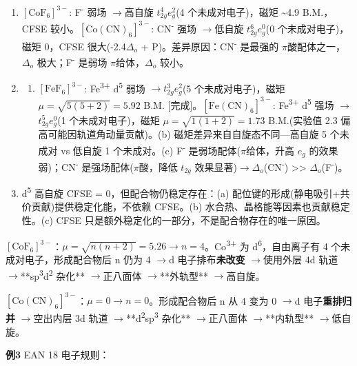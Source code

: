 \documentclass[a4paper,11pt]{ctexart}
\providecommand{\tightlist}{\setlength{\itemsep}{0pt}\setlength{\parskip}{0pt}}
\newcommand{\箭}{\ensuremath{\rightarrow}}
\newcommand{\左箭}{\ensuremath{\leftarrow}}
\newcommand{\上箭}{\ensuremath{\uparrow}}
\newcommand{\下箭}{\ensuremath{\downarrow}}
\newcommand{\衡}{\ensuremath{\rightleftharpoons}}
\newcommand{\双箭}{\ensuremath{\leftrightarrow}}
\newcommand{\约等于}{\ensuremath{\approx}}
\newcommand{\小于等于}{\ensuremath{\leq}}
\newcommand{\大于等于}{\ensuremath{\geq}}
\newcommand{\不等于}{\ensuremath{\neq}}
\newcommand{\西格马}{\ensuremath{\sigma}}
\newcommand{\派}{\ensuremath{\pi}}
\begin{document}
\begin{enumerate}
\begin{enumerate}
  \end{enumerate}
\item
  \([\mathrm{CoF_6}]^{3-}\): F\textsuperscript{-} 弱场 \箭 高自旋 \(t_{2g}^4 e_g^2\)(4 个未成对电子)，磁矩 \textasciitilde4.9 B.M.，CFSE 较小。\([\mathrm{Co(CN)_6}]^{3-}\): CN\textsuperscript{-} 强场 \箭 低自旋 \(t_{2g}^6 e_g^0\)(0 个未成对电子)，磁矩 0，CFSE 很大(-2.4\(\Delta_o\) + P)。差异原因：CN\textsuperscript{-} 是最强的 \派 酸配体之一，\(\Delta_o\) 极大；F\textsuperscript{-} 是弱场 \派 给体，\(\Delta_o\) 较小。
\item
  \begin{enumerate}
  \def\labelenumii{(\alph{enumii})}
  \tightlist
  \item
    \([\mathrm{FeF_6}]^{3-}\): Fe\textsuperscript{3+} d\textsuperscript{5} 弱场 \箭 \(t_{2g}^3 e_g^2\)(5 个未成对电子)，磁矩 \(\mu = \sqrt{5(5+2)} = 5.92\) B.M. {[}完成{]}。\([\mathrm{Fe(CN)_6}]^{3-}\): Fe\textsuperscript{3+} d\textsuperscript{5} 强场 \箭 \(t_{2g}^5 e_g^0\)(1 个未成对电子)，磁矩 \(\mu = \sqrt{1(1+2)} = 1.73\) B.M.(实验值 2.3 偏高可能因轨道角动量贡献)。(b) 磁矩差异来自自旋态不同---高自旋 5 个未成对 vs 低自旋 1 个未成对。(c) F\textsuperscript{-} 是弱场配体(\派 给体，升高 \(e_g\) 的效果弱)；CN\textsuperscript{-} 是强场配体(\派 酸，降低 \(t_{2g}\) 效果显著)\箭 \(\Delta_o\)(CN\textsuperscript{-}) \textgreater\textgreater{} \(\Delta_o\)(F\textsuperscript{-})。
  \end{enumerate}
\item
  d\textsuperscript{5} 高自旋 CFSE = 0，但配合物仍稳定存在：(a) 配位键的形成(静电吸引+共价贡献)提供稳定化能，不依赖 CFSE。(b) 水合热、晶格能等因素也贡献稳定性。(c) CFSE 只是额外稳定化的一部分，不是配合物存在的唯一原因。
\end{enumerate}

\textbf{\([\mathrm{CoF_6}]^{3-}\)}：\(\mu = \sqrt{n(n+2)} = 5.26 \rightarrow n = 4\)。Co\textsuperscript{3+} 为 d\textsuperscript{6}，自由离子有 4 个未成对电子，形成配合物后 n 仍为 4 \箭 d 电子排布\textbf{未改变} \箭 使用外层 4d 轨道 \箭 **sp\textsuperscript{3}d\textsuperscript{2} 杂化** \箭 正八面体 \箭 **外轨型** \箭 高自旋。

\textbf{\([\mathrm{Co(CN)_6}]^{3-}\)}：\(\mu = 0 \rightarrow n = 0\)。形成配合物后 n 从 4 变为 0 \箭 d 电子\textbf{重排归并} \箭 空出内层 3d 轨道 \箭 **d\textsuperscript{2}sp\textsuperscript{3} 杂化** \箭 正八面体 \箭 **内轨型** \箭 低自旋。

\textbf{例3} EAN 18 电子规则：
\end{document}
